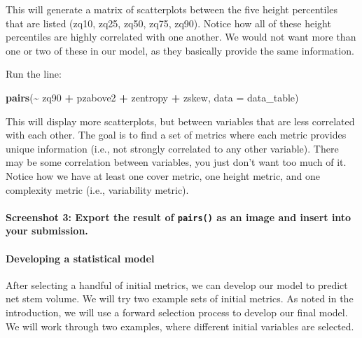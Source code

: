 \documentclass[
]{book}
\newenvironment{Shaded}{\begin{snugshade}}{\end{snugshade}}
\newcommand{\AttributeTok}[1]{\textcolor[rgb]{0.13,0.29,0.53}{#1}}
\newcommand{\FunctionTok}[1]{\textcolor[rgb]{0.13,0.29,0.53}{\textbf{#1}}}
\newcommand{\NormalTok}[1]{#1}
\newcommand{\SpecialCharTok}[1]{\textcolor[rgb]{0.81,0.36,0.00}{\textbf{#1}}}
\begin{document}
This will generate a matrix of scatterplots between the five height percentiles that are listed (zq10, zq25, zq50, zq75, zq90). Notice how all of these height percentiles are highly correlated with one another. We would not want more than one or two of these in our model, as they basically provide the same information.

Run the line:

\begin{Shaded}
\begin{Highlighting}[]
\FunctionTok{pairs}\NormalTok{(}\SpecialCharTok{\textasciitilde{}}\NormalTok{ zq90 }\SpecialCharTok{+}\NormalTok{ pzabove2 }\SpecialCharTok{+}\NormalTok{ zentropy }\SpecialCharTok{+}\NormalTok{ zskew, }\AttributeTok{data =}\NormalTok{ data\_table)}
\end{Highlighting}
\end{Shaded}

This will display more scatterplots, but between variables that are less correlated with each other. The goal is to find a set of metrics where each metric provides unique information (i.e., not strongly correlated to any other variable). There may be some correlation between variables, you just don't want too much of it. Notice how we have at least one cover metric, one height metric, and one complexity metric (i.e., variability metric).

\hypertarget{screenshot-3-export-the-result-of-pairs-as-an-image-and-insert-into-your-submission.}{%
\paragraph*{\texorpdfstring{Screenshot 3: Export the result of \texttt{pairs()} as an image and insert into your submission.}{Screenshot 3: Export the result of pairs() as an image and insert into your submission.}}\label{screenshot-3-export-the-result-of-pairs-as-an-image-and-insert-into-your-submission.}}

\hypertarget{developing-a-statistical-model}{%
\paragraph*{Developing a statistical model}\label{developing-a-statistical-model}}

After selecting a handful of initial metrics, we can develop our model to predict net stem volume. We will try two example sets of initial metrics. As noted in the introduction, we will use a forward selection process to develop our final model. We will work through two examples, where different initial variables are selected.
\end{document}
